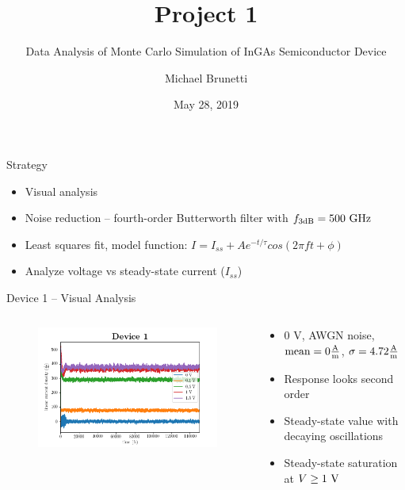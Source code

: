 \documentclass{beamer}
\title{Project 1}
\subtitle{Data Analysis of Monte Carlo Simulation of InGAs Semiconductor Device}
\author{Michael Brunetti}
\institute{
EECE 5090 -- Linear Systems Analysis\\
UMass Lowell}
\date{May 28, 2019}
\begin{document}
 
\frame{\titlepage}

\begin{frame}{Strategy}
    \begin{itemize}
        \item Visual analysis
        \item Noise reduction -- fourth-order Butterworth filter with $f_{3\textnormal{dB}} = 500 \textnormal{ GHz}$
        \item Least squares fit, model function: $I = I_{ss} + A e^{-t/\tau} cos \left( 2 \pi f t + \phi \right)$
        \item Analyze voltage vs steady-state current ($I_{ss}$)
    \end{itemize}
\end{frame}
 
\begin{frame}{Device 1 -- Visual Analysis}

\begin{columns}
\begin{column}{0.5\textwidth}
\begin{figure}
    \centering
    \includegraphics[scale=0.35]{Figures/Device_1/0_to_1_5.png}
    \label{fig:dev_1_1}
\end{figure}{}
\end{column}

\begin{column}{0.5\textwidth}
\begin{itemize}
    \item 0 V, AWGN noise, $\textnormal{mean} = 0 \frac{\textnormal{A}}{\textnormal{m}}$, $\sigma = 4.72 \frac{\textnormal{A}}{\textnormal{m}}$
    \item Response looks second order
    \item Steady-state value with decaying oscillations
    \item Steady-state saturation at $V \geq 1 \textnormal{ V}$
\end{itemize}
\end{column}
\end{columns}

\end{frame}
\end{document}
